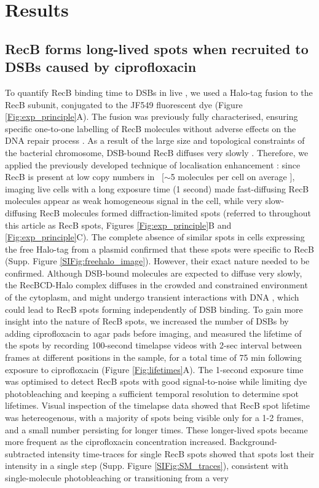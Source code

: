 \section*{Results}

\subsection*{RecB forms long-lived spots when recruited to DSBs caused by cipro\-floxacin}
To quantify RecB binding time to DSBs in live \ecoli, we used a Halo-tag fusion to the RecB subunit, conjugated to the JF549 fluorescent dye (Figure \ref{Fig:exp_principle}A). The fusion was previously fully characterised, ensuring specific one-to-one labelling of RecB molecules without adverse effects on the DNA repair process \cite{Lepore2019a,Lepore2023}. As a result of the large size and topological constraints of the bacterial chromosome, DSB-bound RecB diffuses very slowly \cite{Lepore2023}. Therefore, we applied the previously developed technique of localisation enhancement \cite{Yu2006, Elf2007}: since RecB is present at low copy numbers in \ecoli\ [$\sim$5 molecules per cell on average \cite{Lepore2019a,Kalita2024}], imaging live cells with a long exposure time (1 second) made fast-diffusing RecB molecules appear as weak homogeneous signal in the cell, while very slow-diffusing RecB molecules formed diffraction-limited spots (referred to throughout this article as RecB spots, Figures \ref{Fig:exp_principle}B and \ref{Fig:exp_principle}C). The complete absence of similar spots in cells expressing the free Halo-tag from a plasmid confirmed that these spots were specific to RecB (Supp. Figure \ref{SIFig:freehalo_image}). However, their exact nature needed to be confirmed. Although DSB-bound molecules are expected to diffuse very slowly, the RecBCD-Halo complex diffuses in the crowded and constrained environment of the cytoplasm, and might undergo transient interactions with DNA \cite{Lepore2023}, which could lead to RecB spots forming independently of DSB binding. To gain more insight into the nature of RecB spots, we increased the number of DSBs by adding ciprofloxacin to agar pads before imaging, and measured the lifetime of the spots by recording 100-second timelapse videos with 2-sec interval between frames at different positions in the sample, for a total time of 75 min following exposure to ciprofloxacin (Figure \ref{Fig:lifetimes}A). The 1-second exposure time was optimised to detect RecB spots with good signal-to-noise while limiting dye photobleaching and keeping a sufficient temporal resolution to determine spot lifetimes. Visual inspection of the timelapse data showed that RecB spot lifetime was hetereogenous, with a majority of spots being visible only for a 1-2 frames, and a small number persisting for longer times. These longer-lived spots became more frequent as the ciprofloxacin concentration increased. Background-subtracted intensity time-traces for single RecB spots showed that spots lost their intensity in a single step (Supp. Figure \ref{SIFig:SM_traces}), consistent with single-molecule photobleaching or transitioning from a very 